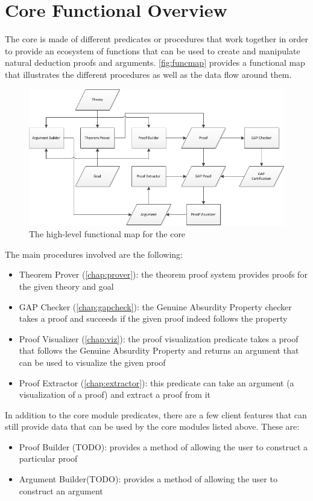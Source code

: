 \documentclass[11pt,twoside,a4paper]{report}
\begin{document}
\chapter{Core Functional Overview}
\label{chap:coreoverview}
The core is made of different predicates or procedures that work together in order to provide an ecosystem of functions that can be used to create and manipulate natural deduction proofs and arguments. \autoref{fig:funcmap} provides a functional map that illustrates the different procedures as well as the data flow around them.

\begin{figure}[ht]
\centerline{\includegraphics[scale=0.85]{img/functional-map.png}}
\caption{The high-level functional map for the core\label{fig:funcmap}}
\end{figure}

The main procedures involved are the following:
\begin{itemize}
\item
Theorem Prover (\autoref{chap:prover}): the theorem proof system provides proofs for the given theory and goal
\item
GAP Checker (\autoref{chap:gapcheck}): the Genuine Absurdity Property checker takes a proof and succeeds if the given proof indeed follows the property
\item
Proof Visualizer (\autoref{chap:viz}): the proof visualization predicate takes a proof that follows the Genuine Absurdity Property and returns an argument that can be used to visualize the given proof
\item
Proof Extractor (\autoref{chap:extractor}): this predicate can take an argument (a visualization of a proof) and extract a proof from it
\end{itemize}

In addition to the core module predicates, there are a few client features that can still provide data that can be used by the core modules listed above. These are:
\begin{itemize}
\item
Proof Builder (TODO): provides a method of allowing the user to construct a particular proof
\item
Argument Builder(TODO): provides a method of allowing the user to construct an argument 
\end{itemize}
\end{document}
